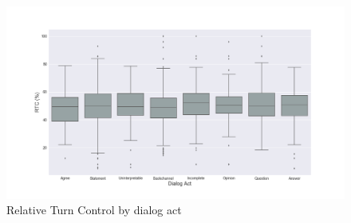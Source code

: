 \begin{figure}[ht!]
\centering
\includegraphics[width=\textwidth]{../scikitlearn/figures/f4.png}
\caption{Relative Turn Control by dialog act\label{overflow}}
\label{f4}
\end{figure}

\pagebreak